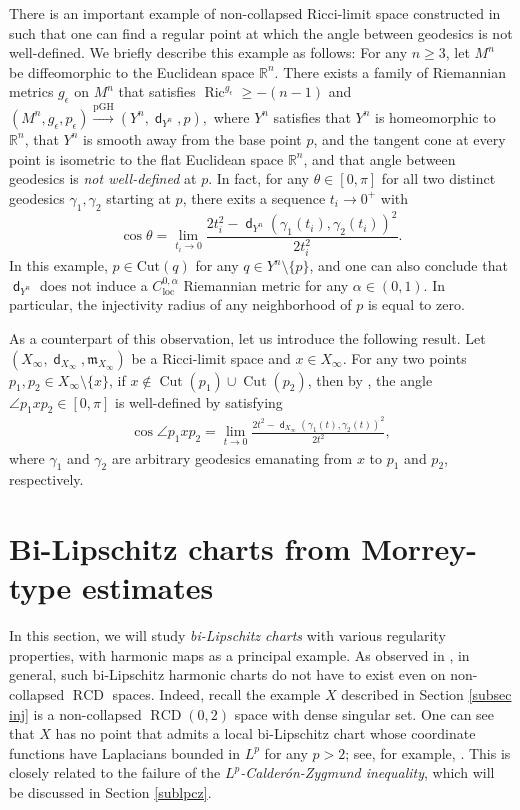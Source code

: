 \documentclass[11pt,reqno]{amsart}
\theoremstyle{definition}
\numberwithin{equation}{section}
\newcommand{\dR}{\mathbb{R}}
\newcommand{\fm}{\mathfrak{m}}
\DeclareMathOperator{\Cut}{Cut}
\DeclareMathOperator{\dist}{\mathsf{d}}
\DeclareMathOperator{\loc}{loc}
\DeclareMathOperator{\RCD}{RCD}
\DeclareMathOperator{\Ric}{Ric}
\begin{document}
There is an important example of non-collapsed Ricci-limit space constructed in \cite{CN} such that one can find a regular point at which the angle between geodesics is not well-defined. We briefly describe this example as follows:
For any $n \ge 3$, let $M^n$ be diffeomorphic to the Euclidean space $\dR^n$. There exists a 
family of Riemannian metrics $g_{\epsilon}$ on $M^n$ that satisfies $\Ric^{g_{\epsilon}} \geq - (n - 1)$
and 
$
    (M^n, g_{\epsilon}, p_{\epsilon}) \xrightarrow{\mathrm{pGH}} (Y^n, \dist_{Y^n}, p),
$
where $Y^n$ satisfies that $Y^n$ is homeomorphic to $\dR^n$, that $Y^n$ is smooth away from the base point $p$, and the tangent cone at every point is isometric to the flat Euclidean space $\dR^n$, and that
     angle between geodesics is {\it  not well-defined} at $p$. In fact, for any $\theta\in [0,\pi]$ for all two distinct geodesics $\gamma_1,\gamma_2$ starting at $p$, there exits a sequence $t_i \to 0^+$ with  
    $$
   \cos \theta= \lim\limits_{t_i \to 0} \frac{2t_i^2 - \dist_{Y^n}(\gamma_1(t_i), \gamma_2(t_i))^2}{2t_i^2}.  
$$
In this example,  $p \in \mathrm{Cut}(q)$ for any $q \in Y^n\setminus \{p\}$, and one can also conclude that $\dist_{Y^n}$ does not induce a $C^{0,\alpha}_{\loc}$ Riemannian metric for any $\alpha \in (0,1)$. In particular, the injectivity radius of any neighborhood of $p$
is equal to zero.

As a counterpart of this observation, let us introduce the following result.
Let $(X_{\infty},\dist_{X_{\infty}},\fm_{X_{\infty}})$ be a Ricci-limit space and $x\in X_{\infty}$. 
For any two points $p_1,p_2\in X_{\infty}\setminus \{x\}$, if $x\not\in \Cut(p_1)\cup \Cut(p_2)$, then by  \cite[Theorem 1.2]{Honda1}, the angle $\angle p_1 x p_2 \in [0, \pi]$ is well-defined by satisfying
\begin{align}
    \cos\angle p_1 x p_2 = \lim\limits_{t \to 0} \frac{2t^2 - \dist_{X_{\infty}}(\gamma_1(t), \gamma_2(t))^2}{2t^2}, 
\end{align}
where $\gamma_1$ and $\gamma_2$ are arbitrary geodesics emanating from $x$ to $p_1$ and $p_2$, respectively.









\section{Bi-Lipschitz charts from Morrey-type estimates}\label{bilipsub}
In this section, we will study \textit{bi-Lipschitz charts} with various regularity properties, with harmonic maps as a principal example. 
As observed in \cite{DZ}, in general, such bi-Lipschitz harmonic charts do not have to exist even on non-collapsed $\RCD$ spaces. Indeed, recall the example $X$ described in Section \ref{subsec inj} is a non-collapsed $\RCD(0, 2)$ space with dense singular set.
One can see that $X$ has no point that admits a local bi-Lipschitz chart whose coordinate functions have Laplacians bounded in $L^p$ for any $p>2$; see, for example, \cite{HS}. This is closely related to the failure of the \textit{$L^p$-Calder{\'o}n-Zygmund inequality}, which will be discussed in Section \ref{sublpcz}.
 
\end{document}
